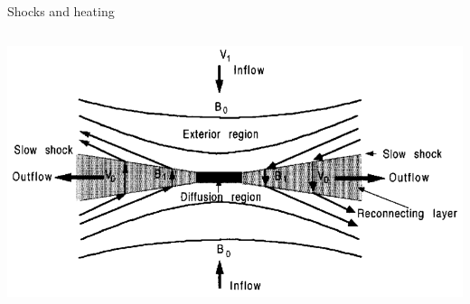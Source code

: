 \documentclass[10pt,aspectratio=169,usenames,dvipsnames]{beamer}
\begin{document}
\begin{frame}{Shocks and heating}
\begin{columns}
\begin{column}{0.5\textwidth}
\includegraphics[width=0.95\linewidth]{2023RAS/Figures/petschek.png}
\end{column}
\end{columns}
\end{frame}
\end{document}
